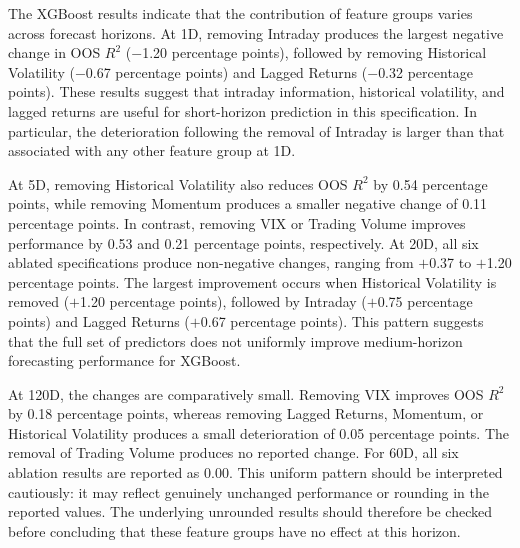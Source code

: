 \documentclass[12pt,twoside]{ord}
\begin{document}
The XGBoost results indicate that the contribution of feature groups varies across forecast horizons. At 1D, removing Intraday produces the largest negative change in OOS $R^2$ ($-$1.20 percentage points), followed by removing Historical Volatility ($-$0.67 percentage points) and Lagged Returns ($-$0.32 percentage points). These results suggest that intraday information, historical volatility, and lagged returns are useful for short-horizon prediction in this specification. In particular, the deterioration following the removal of Intraday is larger than that associated with any other feature group at 1D.

At 5D, removing Historical Volatility also reduces OOS $R^2$ by 0.54 percentage points, while removing Momentum produces a smaller negative change of 0.11 percentage points. In contrast, removing VIX or Trading Volume improves performance by 0.53 and 0.21 percentage points, respectively. At 20D, all six ablated specifications produce non-negative changes, ranging from $+$0.37 to $+$1.20 percentage points. The largest improvement occurs when Historical Volatility is removed ($+$1.20 percentage points), followed by Intraday ($+$0.75 percentage points) and Lagged Returns ($+$0.67 percentage points). This pattern suggests that the full set of predictors does not uniformly improve medium-horizon forecasting performance for XGBoost.

At 120D, the changes are comparatively small. Removing VIX improves OOS $R^2$ by 0.18 percentage points, whereas removing Lagged Returns, Momentum, or Historical Volatility produces a small deterioration of 0.05 percentage points. The removal of Trading Volume produces no reported change. For 60D, all six ablation results are reported as 0.00. This uniform pattern should be interpreted cautiously: it may reflect genuinely unchanged performance or rounding in the reported values. The underlying unrounded results should therefore be checked before concluding that these feature groups have no effect at this horizon.
\end{document}

